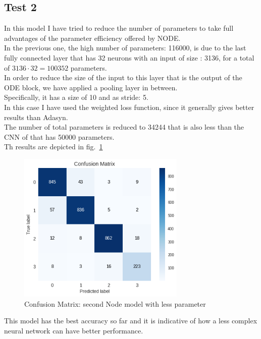 \documentclass[LaM,binding=0.6cm]{sapthesis}
\begin{document}
\subsection{Test 2}
In this model I have tried to reduce the number of parameters to take full advantages of the parameter efficiency offered by NODE.\\In the previous one, the high number of parameters: 116000, is due to the last fully connected layer that has 32 neurons with an input of size : 3136, for a total of $3136 \cdot 32 = 100352$ parameters.\\In order to reduce the size of the input to this layer that is the output of the ODE block, we have applied a pooling layer in between.\\Specifically, it has a size of 10 and as stride: 5.\\In this case I have used the weighted loss function, since it generally gives better results than Adasyn.\\The number of total parameters is reduced to 34244 that is also less than the CNN of \cite{cnnfazeli} that has 50000 parameters.\\Th results are depicted in fig.~\ref{fig:odelp} 
\begin{figure}[H]  \centering
	\includegraphics[width=80mm,scale=0.7]{odelp}
	\caption{Confusion Matrix: second Node model with less parameter}
	\label{fig:odelp}
\end{figure}
This model has the best accuracy so far and it is indicative of how a less complex neural network can have better performance.
\end{document}
